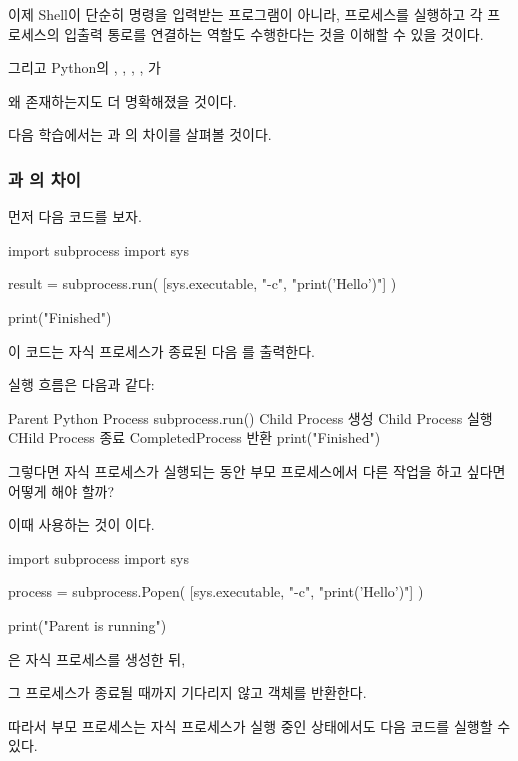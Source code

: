 이제 Shell이 단순히 명령을 입력받는 프로그램이 아니라, 프로세스를 실행하고 각 프로세스의 입출력 통로를 연결하는 역할도 수행한다는 것을 이해할 수 있을 것이다.

그리고 Python의 , , , , 가 

왜 존재하는지도 더 명확해졌을 것이다.

다음 학습에서는 과 의 차이를 살펴볼 것이다.

\subsubsection{과 의 차이}

먼저 다음 코드를 보자.

\begin{dhkcode}
import subprocess
import sys

result = subprocess.run(
    [sys.executable, "-c", "print('Hello')"]
)

print("Finished")
\end{dhkcode}

이 코드는 자식 프로세스가 종료된 다음 를 출력한다.

실행 흐름은 다음과 같다:

\begin{dhksmry}[centered]
Parent Python Process
\da
subprocess.run()
\da
Child Process 생성
\da
Child Process 실행
\da
CHild Process 종료
\da
CompletedProcess 반환
\da
print("Finished")
\end{dhksmry}

그렇다면 자식 프로세스가 실행되는 동안 부모 프로세스에서 다른 작업을 하고 싶다면 어떻게 해야 할까?

이때 사용하는 것이 이다.

\begin{dhkcode}
import subprocess
import sys

process = subprocess.Popen(
    [sys.executable, "-c", "print('Hello')"]
)

print("Parent is running")
\end{dhkcode}

은 자식 프로세스를 생성한 뒤,

그 프로세스가 종료될 때까지 기다리지 않고  객체를 반환한다.

따라서 부모 프로세스는 자식 프로세스가 실행 중인 상태에서도 다음 코드를 실행할 수 있다.

